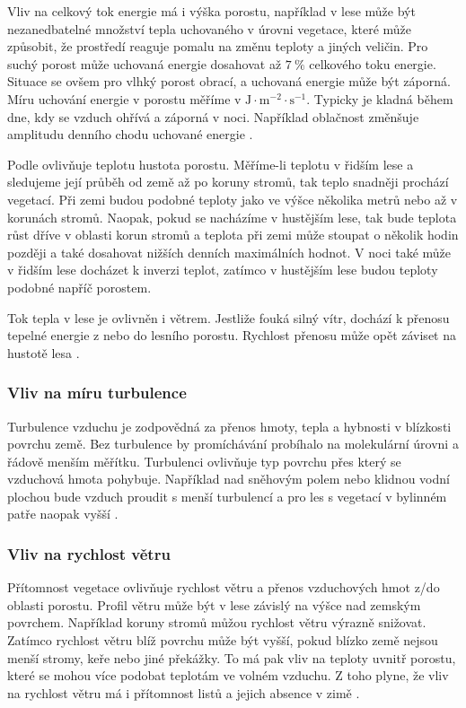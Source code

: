 Vliv na celkový tok energie má i výška porostu, například v lese může být nezanedbatelné množství tepla uchovaného v úrovni vegetace, které může způsobit, že prostředí reaguje pomalu na změnu teploty a jiných veličin. Pro suchý porost může uchovaná energie dosahovat až $\SI{7}{\%}$ celkového toku energie. Situace se ovšem pro vlhký porost obrací, a uchovaná energie může být záporná. Míru uchování energie v porostu měříme v $\si{}{\text{J}\cdot \text{m}^{-2}\cdot \text{s}^{-1}}$. Typicky je kladná během dne, kdy se vzduch ohřívá a záporná v noci. Například oblačnost změnšuje amplitudu denního chodu uchované energie \parencite{alma}. 

Podle \parencite{alma} ovlivňuje teplotu hustota porostu. Měříme-li teplotu v řidším lese a sledujeme její průběh od země až po koruny stromů, tak teplo snadněji prochází vegetací. Při zemi budou podobné teploty jako ve výšce několika metrů nebo až v korunách stromů. Naopak, pokud se nacházíme v hustějším lese, tak bude teplota růst dříve v oblasti korun stromů a teplota při zemi může stoupat o několik hodin později a také dosahovat nižších denních maximálních hodnot. V noci také může v řidším lese docházet k inverzi teplot, zatímco v hustějším lese budou teploty podobné napříč porostem. 

Tok tepla v lese je ovlivněn i větrem. Jestliže fouká silný vítr, dochází k přenosu tepelné energie z nebo do lesního porostu. Rychlost přenosu může opět záviset na hustotě lesa \parencite{alma}. 

\subsubsection{Vliv na míru turbulence}\label{chap:vlivnaturbulenci}
Turbulence vzduchu je zodpovědná za přenos hmoty, tepla a hybnosti v blízkosti povrchu země. Bez turbulence by promíchávání probíhalo na molekulární úrovni a řádově menším měřítku. Turbulenci ovlivňuje typ povrchu přes který se vzduchová hmota pohybuje. Například nad sněhovým polem nebo klidnou vodní plochou bude vzduch proudit s menší turbulencí a pro les s vegetací v bylinném patře naopak vyšší \parencite{alma}. 

\subsubsection{Vliv na rychlost větru}\label{chap:vlivnavitr}
Přítomnost vegetace ovlivňuje rychlost větru a přenos vzduchových hmot z/do oblasti porostu. Profil větru může být v lese závislý na výšce nad zemským povrchem. Například koruny stromů můžou rychlost větru výrazně snižovat. Zatímco rychlost větru blíž povrchu může být vyšší, pokud blízko země nejsou menší stromy, keře nebo jiné překážky. To má pak vliv na teploty uvnitř porostu, které se mohou více podobat teplotám ve volném vzduchu. Z toho plyne, že vliv na rychlost větru má i přítomnost listů a jejich absence v zimě \parencite{alma}. 

